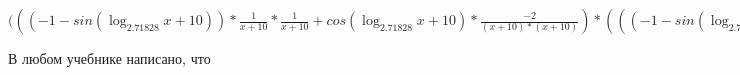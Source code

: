 \documentclass[12pt,a4paper,fleqn]{article}
\theoremstyle{definition}
\begin{document}
$((( -1  - sin(\log_{ 2.71828 }{ x  +  10 })) * \frac{ 1 }{ x  +  10 }
 * \frac{ 1 }{ x  +  10 }
 + cos(\log_{ 2.71828 }{ x  +  10 }) * \frac{ -2 }{( x  +  10 ) * ( x  +  10 )}
) * ((( -1  - sin(\log_{ 2.71828 }{ x  +  10 })) * \frac{ 1 }{ x  +  10 }
 * \frac{ 1 }{ x  +  10 }
 + cos(\log_{ 2.71828 }{ x  +  10 }) * \frac{ -2 }{( x  +  10 ) * ( x  +  10 )}
) * { 3 }^{sin(\log_{ 2.71828 }{ x  +  10 })} + cos(\log_{ 2.71828 }{ x  +  10 }) * \frac{ 1 }{ x  +  10 }
 * cos(\log_{ 2.71828 }{ x  +  10 }) * \frac{ 1 }{ x  +  10 }
 * { 3 }^{sin(\log_{ 2.71828 }{ x  +  10 })}) = (( -1  - sin(\log_{ 2.71828 }{ x  +  10 })) * \frac{ 1 }{ x  +  10 }
 * \frac{ 1 }{ x  +  10 }
 + cos(\log_{ 2.71828 }{ x  +  10 }) * \frac{ -2 }{( x  +  10 ) * ( x  +  10 )}
) * ((( -1  - sin(\log_{ 2.71828 }{ x  +  10 })) * \frac{ 1 }{ x  +  10 }
 * \frac{ 1 }{ x  +  10 }
 + cos(\log_{ 2.71828 }{ x  +  10 }) * \frac{ -2 }{( x  +  10 ) * ( x  +  10 )}
) * { 3 }^{sin(\log_{ 2.71828 }{ x  +  10 })} + cos(\log_{ 2.71828 }{ x  +  10 }) * \frac{ 1 }{ x  +  10 }
 * cos(\log_{ 2.71828 }{ x  +  10 }) * \frac{ 1 }{ x  +  10 }
 * { 3 }^{sin(\log_{ 2.71828 }{ x  +  10 })})$

В любом учебнике написано, что
\end{document}
